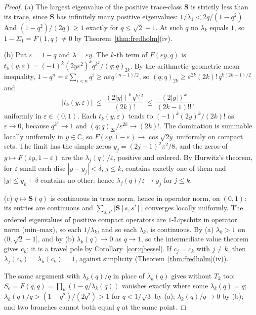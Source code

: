 \documentclass[11pt]{article}
\theoremstyle{plain}
\theoremstyle{definition}
\theoremstyle{remark}
\newcommand{\C}{\mathbb{C}}
\theoremstyle{plain}\newtheorem*{maintheorem}{Main Theorem}
\begin{document}
\begin{proof}
(a) The largest eigenvalue of the positive trace-class $\mathbf S$ is strictly less than its trace,
since $\mathbf S$ has infinitely many positive eigenvalues: $1/\lambda_1<2q/(1-q^2)$. And
$(1-q^2)/(2q)\ge1$ exactly for $q\le\sqrt2-1$. At such $q$ no $\lambda_k$ equals $1$, so
$1-\Sigma_1=F(1,q)\ne0$ by Theorem~\ref{thm:fredholm}\textup{(iv)}.

(b) Put $\varepsilon=1-q$ and $\lambda=\varepsilon y$. The $k$-th term of $F(\varepsilon y,q)$ is
$t_k(y,\varepsilon)=(-1)^k(2y\varepsilon^2)^kq^{k^2}/(q;q)_{2k}$. By the arithmetic--geometric mean
inequality, $1-q^n=\varepsilon\sum_{i<n}q^i\ge n\varepsilon q^{(n-1)/2}$, so
$(q;q)_{2k}\ge\varepsilon^{2k}(2k)!\,q^{k(2k-1)/2}$ and
\[
   |t_k(y,\varepsilon)|\ \le\ \frac{(2|y|)^k\,q^{k/2}}{(2k)!}\ \le\ \frac{(2|y|)^k}{(2k-1)!!},
\]
uniformly in $\varepsilon\in(0,1)$. Each $t_k(y,\varepsilon)$ tends to $(-1)^k(2y)^k/(2k)!$ as
$\varepsilon\to0$, because $q^{k^2}\to1$ and $(q;q)_{2k}/\varepsilon^{2k}\to(2k)!$. The domination
is summable locally uniformly in $y\in\C$, so $F(\varepsilon y,1-\varepsilon)\to\cos\sqrt{2y}$
uniformly on compact sets. The limit has the simple zeros $y_j=(2j-1)^2\pi^2/8$, and the zeros of
$y\mapsto F(\varepsilon y,1-\varepsilon)$ are the $\lambda_j(q)/\varepsilon$, positive and ordered.
By Hurwitz's theorem, for $\varepsilon$ small each disc $|y-y_j|<\delta$, $j\le k$, contains exactly
one of them and $|y|\le y_k+\delta$ contains no other; hence $\lambda_j(q)/\varepsilon\to y_j$ for
$j\le k$.

(c) $q\mapsto\mathbf S(q)$ is continuous in trace norm, hence in operator norm, on $(0,1)$: its
entries are continuous and $\sum_{s,s'}|\mathbf S[s,s']|$ converges locally uniformly. The ordered
eigenvalues of positive compact operators are $1$-Lipschitz in operator norm (min--max), so each
$1/\lambda_k$, and so each $\lambda_k$, is continuous. By (a) $\lambda_k>1$ on $(0,\sqrt2-1]$, and by
(b) $\lambda_k(q)\to0$ as $q\to1$, so the intermediate value theorem gives $c_k$; it is a travel pole
by Corollary~\ref{cor:qbessel}. If $c_j=c_k$ with $j\ne k$, then $\lambda_j(c_k)=\lambda_k(c_k)=1$,
against simplicity (Theorem~\ref{thm:fredholm}\textup{(iv)}).

The same argument with $\lambda_k(q)/q$ in place of $\lambda_k(q)$ gives {\cite[Lemma ``infinitude of the zeros of the bulk block'', \textup{lem:infzeros}]{Bonfioli2026bB}}
without $T_2$ too: $S_e=F(q,q)=\prod_k(1-q/\lambda_k(q))$ vanishes exactly where some
$\lambda_k(q)=q$; $\lambda_k(q)/q>(1-q^2)/(2q^2)>1$ for $q<1/\sqrt3$ by (a); $\lambda_k(q)/q\to0$ by
(b); and two branches cannot both equal $q$ at the same point.
\end{proof}
\end{document}
